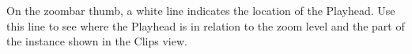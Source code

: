 On the zoombar thumb, a white line indicates the location of the  Playhead. Use this line to see where the  Playhead is in relation to the zoom level and the part of the  instance shown in the Clips view. 